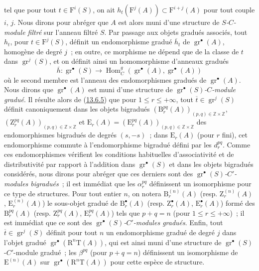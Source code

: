 tel que pour tout $t\in\mathrm F^i(S)$, on ait
$h_t(\mathrm F^j(A))\subset\mathrm F^{i+j}(A)$ pour tout couple $i$,
$j$. Nous dirons pour abréger que $A$ est alors muni d'une structure de
\emph{$S$-$C$-module filtré} sur l'anneau filtré $S$. Par passage aux
objets gradués associés, tout $h_t$, pour $t\in\mathrm F^j(S)$, définit
un endomorphisme gradué $\overline h_t$ de
$\operatorname{gr}^\bullet(A)$, homogène de degré $j$~; en outre, ce
morphisme ne dépend que de la classe de $t$ dans
$\operatorname{gr}^j(S)$, et on définit ainsi un homomorphisme d'anneaux
gradués
\[
\overline h:\operatorname{gr}^\bullet(S)\to
\operatorname{Hom}_C^g(\operatorname{gr}^\bullet(A),
\operatorname{gr}^\bullet(A))
\]
où le second membre est l'anneau des endomorphismes gradués de
$\operatorname{gr}^\bullet(A)$. Nous dirons que
$\operatorname{gr}^\bullet(A)$ est muni d'une structure de
\emph{$\operatorname{gr}^\bullet(S)$-$C$-module gradué}. Il résulte alors
de (\hyperref[0.13.6.5-fr]{13.6.5}) que pour
$1\leq r\leq+\infty$, tout
$\overline t\in\operatorname{gr}^j(S)$ définit canoniquement dans les
objets bigradués
$(\mathrm B_r^{pq}(A))_{(p,q)\in\mathbb Z\times\mathbb Z}$,
$(\mathrm Z_r^{pq}(A))_{(p,q)\in\mathbb Z\times\mathbb Z}$ et
$\mathrm E_r(A)=(\mathrm E_r^{pq}(A))_{(p,q)\in\mathbb Z\times\mathbb Z}$
des endomorphismes bigradués de degrés $(s,-s)$~; dans
$\mathrm E_r(A)$ (pour $r$ fini), cet endomorphisme commute à
l'endomorphisme bigradué défini par les $d_r^{pq}$. Comme ces
endomorphismes vérifient les conditions habituelles d'associativité et
de distributivité par rapport à l'addition dans
$\operatorname{gr}^\bullet(S)$ et dans les objets bigradués considérés,
nous dirons pour abréger que ces derniers sont des
\emph{$\operatorname{gr}^\bullet(S)$-$C'$-modules bigradués}~; il est
immédiat que les $\alpha_r^{pq}$ définissent un isomorphisme pour ce type
de structures. Pour tout entier $n$, on notera
$\mathrm B_r^{(n)}(A)$ (resp. $\mathrm Z_r^{(n)}(A)$,
$\mathrm E_r^{(n)}(A)$) le sous-objet gradué de
$\mathrm B_r^\bullet(A)$ (resp. $\mathrm Z_r^\bullet(A)$,
$\mathrm E_r^\bullet(A)$) formé des $\mathrm B_r^{pq}(A)$ (resp.
$\mathrm Z_r^{pq}(A)$, $\mathrm E_r^{pq}(A)$) tels que $p+q=n$ (pour
$1\leq r\leq+\infty$)~; il est immédiat que ce sont des
\emph{$\operatorname{gr}^\bullet(S)$-$C'$-modules gradués}. Enfin, tout
$\overline t\in\operatorname{gr}^j(S)$ définit pour tout $n$ un
endomorphisme gradué de degré $j$ dans l'objet gradué
$\operatorname{gr}^\bullet(\mathrm R^n\mathrm T(A))$, qui est ainsi muni
d'une structure de
$\operatorname{gr}^\bullet(S)$-$C'$-module gradué~; les
$\beta^{pq}$ (pour $p+q=n$) définissent un isomorphisme de
$\mathrm E^{(n)}(A)$ sur
$\operatorname{gr}^\bullet(\mathrm R^n\mathrm T(A))$ pour cette espèce
de structure.

